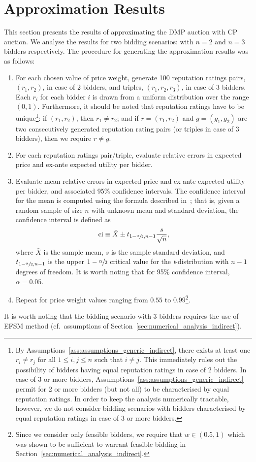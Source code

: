 \section{Approximation Results} %
\label{sec:approximation_results_approximation}
This section presents the results of approximating the DMP auction with CP auction. We analyse the results for two bidding scenarios: with $n=2$ and $n=3$ bidders respectively. The procedure for generating the approximation results was as follows:
\begin{enumerate}
\item For each chosen value of price weight, generate 100 reputation ratings pairs, $(r_1, r_2)$, in case of 2 bidders, and triples, $(r_1, r_2, r_3)$, in case of 3 bidders. Each $r_i$ for each bidder $i$ is drawn from a uniform distribution over the range $(0,1)$. Furthermore, it should be noted that reputation ratings have to be unique\footnote{By Assumptions~\ref{ass:assumptions_generic_indirect}, there exists at least one $r_i\neq r_j$ for all $1\leq i,j\leq n$ such that $i\neq j$. This immediately rules out the possibility of bidders having equal reputation ratings in case of 2 bidders. In case of 3 or more bidders, Assumptions~\ref{ass:assumptions_generic_indirect} permit for 2 or more bidders (but not all) to be characterised by equal reputation ratings. In order to keep the analysis numerically tractable, however, we do not consider bidding scenarios with bidders characterised by equal reputation ratings in case of 3 or more bidders.}: if $(r_1,r_2)$, then $r_1\neq r_2$; and if $r=(r_1,r_2)$ and $g=(g_1,g_2)$ are two consecutively generated reputation rating pairs (or triples in case of 3 bidders), then we require $r \neq g$.
\item For each reputation ratings pair/triple, evaluate relative errors in expected price and ex-ante expected utility per bidder.
\item Evaluate mean relative errors in expected price and ex-ante expected utility per bidder, and associated 95\% confidence intervals. The confidence interval for the mean is computed using the formula described in~\cite{LawChapter42007}; that is, given a random sample of size $n$ with unknown mean and standard deviation, the confidence interval is defined as
\begin{equation*}
  \text{ci}\equiv\bar{X}\pm t_{1-\sfrac{\alpha}{2},n-1}\frac{s}{\sqrt{n}},
\end{equation*}
where $\bar{X}$ is the sample mean, $s$ is the sample standard deviation, and $t_{1-\sfrac{\alpha}{2}, n-1}$ is the upper $1-\sfrac{\alpha}{2}$ critical value for the \emph{t}-distribution with $n-1$ degrees of freedom. It is worth noting that for 95\% confidence interval, $\alpha=0.05$.
\item Repeat for price weight values ranging from $0.55$ to $0.99$\footnote{Since we consider only feasible bidders, we require that $w\in(0.5,1)$ which was shown to be sufficient to warrant feasible bidding in Section~\ref{sec:numerical_analysis_indirect}.}.
\end{enumerate}
It is worth noting that the bidding scenario with 3 bidders requires the use of EFSM method (cf.~assumptions of Section~\ref{sec:numerical_analysis_indirect}).


